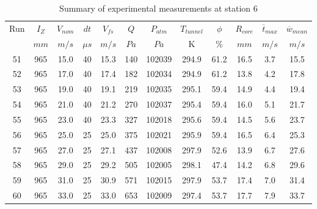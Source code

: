 \begin{table}[H]
\begin{center}
\begin{tabular}{|cccccccccccc|}
	\hline
	Run & $I_Z$ & $V_{nom}$ & $dt$ & $V_{fs}$ & $Q$ & $P_{atm}$ & $T_{tunnel}$ & $\phi$ & $R_{core}$ & $\overline{t}_{max}$ & $\overline{w}_{mean}$\\
	  & $mm$ & $m/s$ & $\mu s$ & $m/s$ & $Pa$ & $Pa$ & K & $\%$ & $mm$ & $m/s$ & $m/s$\\
	\hline
	51 & 965 & 15.0 & 40 & 15.3 & 140 & 102039 & 294.9 & 61.2 & 16.5 & 3.7 & 15.5\\
	52 & 965 & 17.0 & 40 & 17.4 & 182 & 102034 & 294.9 & 61.2 & 13.8 & 4.2 & 17.8\\
	53 & 965 & 19.0 & 40 & 19.1 & 219 & 102035 & 295.1 & 59.4 & 14.9 & 4.4 & 19.4\\
	54 & 965 & 21.0 & 40 & 21.2 & 270 & 102037 & 295.4 & 59.4 & 16.0 & 5.1 & 21.7\\
	55 & 965 & 23.0 & 40 & 23.3 & 327 & 102018 & 295.6 & 59.4 & 14.5 & 5.6 & 23.7\\
	56 & 965 & 25.0 & 25 & 25.0 & 375 & 102021 & 295.9 & 59.4 & 16.5 & 6.4 & 25.3\\
	57 & 965 & 27.0 & 25 & 27.1 & 437 & 102008 & 297.9 & 52.6 & 13.9 & 6.7 & 27.6\\
	58 & 965 & 29.0 & 25 & 29.2 & 505 & 102005 & 298.1 & 47.4 & 14.2 & 6.8 & 29.6\\
	59 & 965 & 31.0 & 25 & 30.9 & 571 & 102015 & 297.9 & 53.7 & 17.4 & 7.0 & 31.4\\
	60 & 965 & 33.0 & 25 & 33.0 & 653 & 102009 & 297.4 & 53.7 & 17.7 & 7.9 & 33.7\\
	\hline
\end{tabular}
\caption{Summary of experimental measurements at station 6}
\label{table:experiment_results_6}
\end{center}
\end{table}
